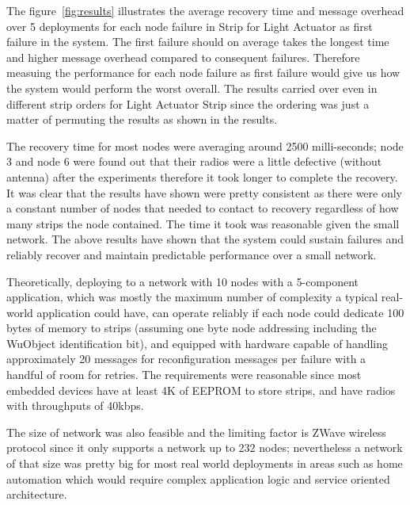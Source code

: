 The figure~\ref{fig:results}
illustrates the average recovery time and message overhead over 5 deployments
for each node failure in Strip for Light Actuator as first failure in the
system. The first failure should on average takes the longest time and higher
message overhead compared to consequent failures. Therefore measuing the
performance for each node failure as first failure would give us how the system
would perform the worst overall. The results carried over even in different
strip orders for Light Actuator Strip since the ordering was just a matter of
permuting the results as shown in the results.

The recovery time for most nodes were averaging around 2500 milli-seconds; node
3 and node 6 were found out that their radios were a little defective (without
antenna) after the experiments therefore it took longer to complete the
recovery. It was clear that the results have shown were pretty consistent as
there were only a constant number of nodes that needed to contact to recovery
regardless of how many strips the node contained. The time it took was reasonable
given the small network. The above results have shown that the system
could sustain failures and reliably recover and maintain predictable performance
over a small network.



Theoretically, deploying to a network with 10 nodes with a 5-component application, which was mostly
the maximum number of complexity a typical real-world application could have, can
operate reliably if each node could dedicate 100 bytes of memory to strips
(assuming one byte node addressing including the WuObject identification 
bit), and equipped with hardware
capable of handling approximately 20 messages for reconfiguration messages per
failure with a handful of room for retries. The requirements were reasonable since most embedded devices have at
least 4K of EEPROM to store strips, and have radios with throughputs of 40kbps.

The size of network was also feasible and the limiting factor is ZWave wireless
protocol since it only supports a network up to 232 nodes; nevertheless
a network of that size was pretty big for most real world deployments in areas
such as home automation which would require complex application logic and
service oriented architecture.

